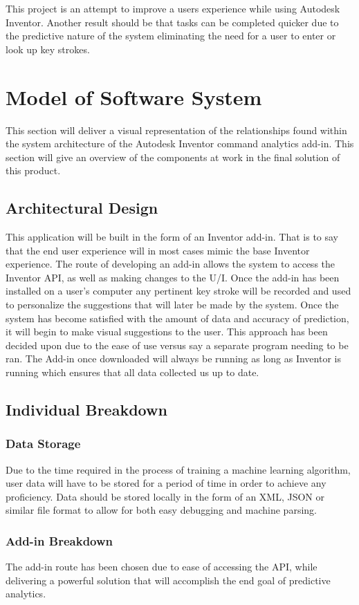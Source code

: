 \documentclass[onecolumn, draftclsnofoot,10pt, compsoc]{IEEEtran}
\begin{document}
This project is an attempt to improve a users experience while using Autodesk Inventor. Another result should be that tasks can be completed quicker due to the predictive nature of the system eliminating the need for a user to enter or look up key strokes. 
\null\newpage
\section{Model of Software System}
This section will deliver a visual representation of the relationships found within the system architecture of the Autodesk Inventor command analytics add-in. This section will give an overview of the components at work in the final solution of this product. 
\subsection{Architectural Design}
This application will be built in the form of an Inventor add-in. That is to say that the end user experience will in most cases mimic the base Inventor experience. The route of developing an add-in allows the system to access the Inventor API, as well as making changes to the U/I. Once the add-in has been installed on a user's computer any pertinent key stroke will be recorded and used to personalize the suggestions that will later be made by the system. Once the system has become satisfied with the amount of data and accuracy of prediction, it will begin to make visual suggestions to the user. This approach has been decided upon due to the ease of use versus say a separate program needing to be ran. The Add-in once downloaded will always be running as long as Inventor is running which ensures that all data collected us up to date. 
\subsection{Individual Breakdown}
\subsubsection{Data Storage}
Due to the time required in the process of training a machine learning algorithm, user data will have to be stored for a period of time in order to achieve any proficiency.  Data should be stored locally in the form of an XML, JSON or similar file format to allow for both easy debugging and machine parsing.

\subsubsection{Add-in Breakdown}
The add-in route has been chosen due to ease of accessing the API, while delivering a powerful solution that will accomplish the end goal of predictive analytics. 
\end{document}
